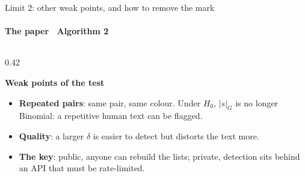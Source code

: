 \documentclass[aspectratio=169,10pt,t]{beamer}
\newcommand{\key}[1]{\textcolor{calblue}{\textbf{#1}}}
\newcommand{\tightmath}{%
  \setlength{\abovedisplayskip}{3pt}%
  \setlength{\belowdisplayskip}{3pt}%
  \setlength{\abovedisplayshortskip}{1pt}%
  \setlength{\belowdisplayshortskip}{1pt}%
}
\begin{document}
\begin{frame}{Limit 2: other weak points, and how to remove the mark}
  \framesubtitle{The paper \textperiodcentered\ Algorithm 2}
  \tightmath
  \begin{columns}[T,onlytextwidth]
    \begin{column}{0.42\textwidth}
      \raggedright
      \key{Weak points of the test}
      \begin{itemize}
        \item \key{Repeated pairs}: same pair, same colour. Under $H_0$, $|s|_G$ is no longer Binomial: a repetitive human text can be flagged. 
        \item \key{Quality}: a larger $\delta$ is easier to detect but distorts the text more.
        \item \key{The key}: public, anyone can rebuild the lists; private, detection sits behind an API that must be rate-limited.


\end{itemize}
\end{column}
\end{columns}
\end{frame}
\end{document}
